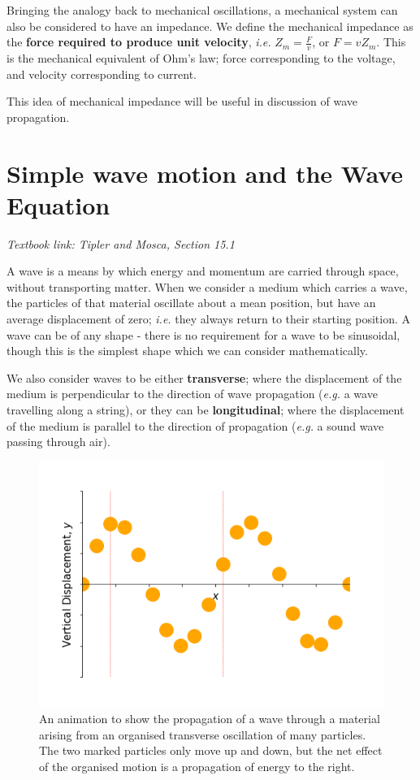\documentclass[
]{book}
\begin{document}
Bringing the analogy back to mechanical oscillations, a mechanical system can also be considered to have an impedance. We define the mechanical impedance as the \textbf{force required to produce unit velocity}, \emph{i.e.} \(Z_m = \frac{F}{v}\), or \(F = vZ_m\). This is the mechanical equivalent of Ohm's law; force corresponding to the voltage, and velocity corresponding to current.

This idea of mechanical impedance will be useful in discussion of wave propagation.

\hypertarget{sec:ch6-wavemotion}{%
\chapter{Simple wave motion and the Wave Equation}\label{sec:ch6-wavemotion}}

\emph{Textbook link: Tipler and Mosca, Section 15.1}

A wave is a means by which energy and momentum are carried through space, without transporting matter. When we consider a medium which carries a wave, the particles of that material oscillate about a mean position, but have an average displacement of zero; \emph{i.e.} they always return to their starting position. A wave can be of any shape - there is no requirement for a wave to be sinusoidal, though this is the simplest shape which we can consider mathematically.

We also consider waves to be either \textbf{transverse}; where the displacement of the medium is perpendicular to the direction of wave propagation (\emph{e.g.} a wave travelling along a string), or they can be \textbf{longitudinal}; where the displacement of the medium is parallel to the direction of propagation (\emph{e.g.} a sound wave passing through air).

\begin{figure}

{\centering \includegraphics[width=0.7\linewidth]{visualisations/ch6-transversewave2} 

}

\caption{An animation to show the propagation of a wave through a material arising from an organised transverse oscillation of many particles. The two marked particles only move up and down, but the net effect of the organised motion is a propagation of energy to the right.}\label{fig:ch6-transversewaveill1}
\end{figure}
\end{document}
